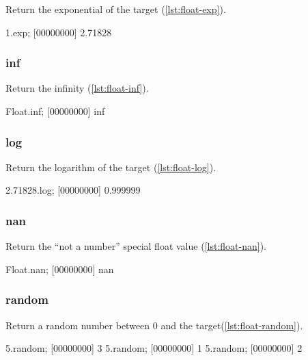 Return the exponential of the target (\autoref{lst:float-exp}).

\begin{urbiscript}[caption=Float.exp, label=lst:float-exp,
  float=\floatposh]
  1.exp;
  [00000000] 2.71828
\end{urbiscript}

\subsubsection{inf}

Return the infinity (\autoref{lst:float-inf}).

\begin{urbiscript}[caption=Float.inf, label=lst:float-inf,
  float=\floatposh]
  Float.inf;
  [00000000] inf
\end{urbiscript}

\subsubsection{log}

Return the logarithm of the target (\autoref{lst:float-log}).

\begin{urbiscript}[caption=Float.log, label=lst:float-log,
  float=\floatposh]
  2.71828.log;
  [00000000] 0.999999
\end{urbiscript}

\subsubsection{nan}

Return the ``not a number'' special float value (\autoref{lst:float-nan}).

\begin{urbiscript}[caption=Float.nan, label=lst:float-nan,
  float=\floatposh]
  Float.nan;
  [00000000] nan
\end{urbiscript}

\subsubsection{random}

Return a random number between 0 and the target(\autoref{lst:float-random}).

\begin{urbiscript}[caption=Float.random, label=lst:float-random,
  float=\floatposh]
  5.random;
  [00000000] 3
  5.random;
  [00000000] 1
  5.random;
  [00000000] 2
\end{urbiscript}

